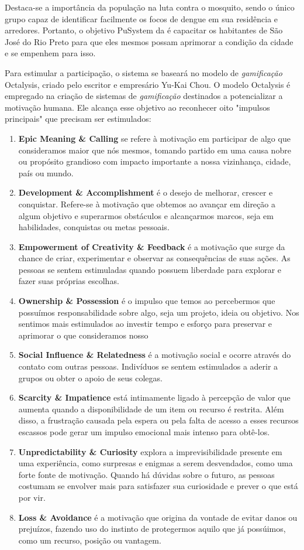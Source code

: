 \documentclass[a4paper, 12pt]{article}
\begin{document}
Destaca-se a importância da população na luta contra o mosquito, sendo o único grupo capaz de identificar facilmente os focos de dengue em sua residência e arredores. Portanto, o objetivo PuSystem da é capacitar os habitantes de São José do Rio Preto para que eles mesmos possam aprimorar a condição da cidade e se empenhem para isso.

Para estimular a participação, o sistema se baseará no modelo de \textit{gamificação} Octalysis, criado pelo escritor e empresário Yu-Kai Chou.  O modelo Octalysis é empregado na criação de sistemas de \textit{gamificação} destinados a potencializar a motivação humana.  Ele alcança esse objetivo ao reconhecer oito "impulsos principais" que precisam ser estimulados:

\begin{enumerate}
    \item \textbf{Epic Meaning \& Calling} se refere à motivação em participar de algo que consideramos maior que nós mesmos, tomando partido em uma causa nobre ou propósito grandioso com impacto importante a nossa vizinhança, cidade, país ou mundo. 
    \item \textbf{Development \& Accomplishment} é o desejo de melhorar, crescer e conquistar. Refere-se à motivação que obtemos ao avançar em direção a algum objetivo e superarmos obstáculos e alcançarmos marcos, seja em habilidades, conquistas ou metas pessoais.
    \item \textbf{Empowerment of Creativity \& Feedback} é a motivação que surge da chance de criar, experimentar e observar as consequências de suas ações. As pessoas se sentem estimuladas quando possuem liberdade para explorar e fazer suas próprias escolhas. 
    \item \textbf{Ownership \& Possession} é o impulso que temos ao percebermos que possuímos responsabilidade sobre algo, seja um projeto, ideia ou objetivo. Nos sentimos mais estimulados ao investir tempo e esforço para preservar e aprimorar o que consideramos nosso
    \item \textbf{Social Influence \& Relatedness} é a motivação social e ocorre através do contato com outras pessoas. Indivíduos se sentem estimulados a aderir a grupos ou  obter o apoio de seus colegas. 
    \item \textbf{Scarcity \& Impatience} está intimamente ligado à percepção de valor que aumenta quando a disponibilidade de um item ou recurso é restrita. Além disso, a frustração causada pela espera ou pela falta de acesso a esses recursos escassos pode gerar um impulso emocional mais intenso para obtê-los.
    \item \textbf{Unpredictability \& Curiosity} explora a imprevisibilidade presente em uma experiência, como surpresas e enigmas a serem desvendados, como uma forte fonte de motivação. Quando há dúvidas sobre o futuro, as pessoas costumam se envolver mais para satisfazer sua curiosidade e prever o que está por vir.
    \item \textbf{Loss \& Avoidance} é a motivação que origina da vontade de evitar danos ou prejuízos, fazendo uso do instinto de protegermos aquilo que já possúimos, como um recurso, posição ou vantagem.
\end{enumerate}
\end{document}
